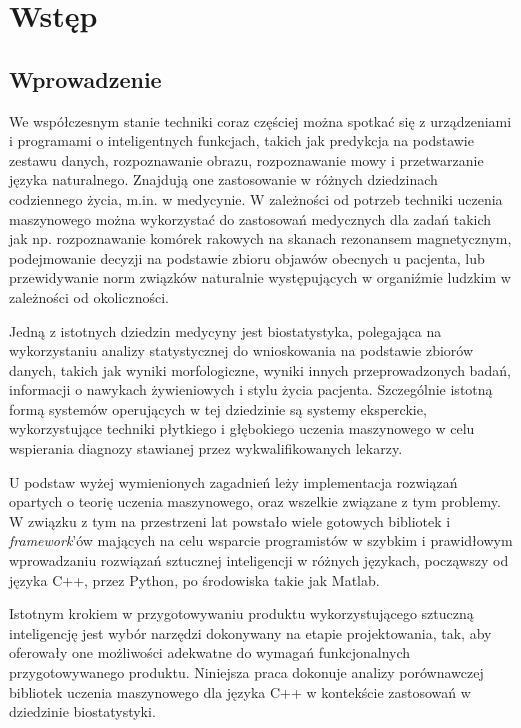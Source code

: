 \chapter{Wstęp}
\section{Wprowadzenie} %

We współczesnym stanie techniki coraz częściej można spotkać się z urządzeniami i programami o inteligentnych funkcjach, takich jak predykcja na podstawie zestawu danych, rozpoznawanie obrazu, rozpoznawanie mowy i przetwarzanie języka naturalnego. Znajdują one zastosowanie w różnych dziedzinach codziennego życia, m.in. w medycynie. W zależności od potrzeb techniki uczenia maszynowego można wykorzystać do zastosowań medycznych dla zadań takich jak np. rozpoznawanie komórek rakowych na skanach rezonansem magnetycznym, podejmowanie decyzji na podstawie zbioru objawów obecnych u pacjenta, lub przewidywanie norm związków naturalnie występujących w organiźmie ludzkim w zależności od okoliczności. 

Jedną z istotnych dziedzin medycyny jest biostatystyka, polegająca na wykorzystaniu analizy statystycznej do wnioskowania na podstawie zbiorów danych, takich jak wyniki morfologiczne, wyniki innych przeprowadzonych badań, informacji o nawykach żywieniowych i stylu życia pacjenta. Szczególnie istotną formą systemów operujących w tej dziedzinie są systemy eksperckie, wykorzystujące techniki płytkiego i głębokiego uczenia maszynowego w celu wspierania diagnozy stawianej przez wykwalifikowanych lekarzy. 

U podstaw wyżej wymienionych zagadnień leży implementacja rozwiązań opartych o teorię uczenia maszynowego, oraz wszelkie związane z tym problemy. W związku z tym na przestrzeni lat powstało wiele gotowych bibliotek i \textit{framework}'ów mających na celu wsparcie programistów w szybkim i prawidłowym wprowadzaniu rozwiązań sztucznej inteligencji w różnych językach, począwszy od języka C++, przez Python, po środowiska takie jak Matlab. 

Istotnym krokiem w przygotowywaniu produktu wykorzystującego sztuczną inteligencję jest wybór narzędzi dokonywany na etapie projektowania, tak, aby oferowały one możliwości adekwatne do wymagań funkcjonalnych przygotowywanego produktu. Niniejsza praca dokonuje analizy porównawczej bibliotek uczenia maszynowego dla języka C++ w kontekście zastosowań w dziedzinie biostatystyki.

